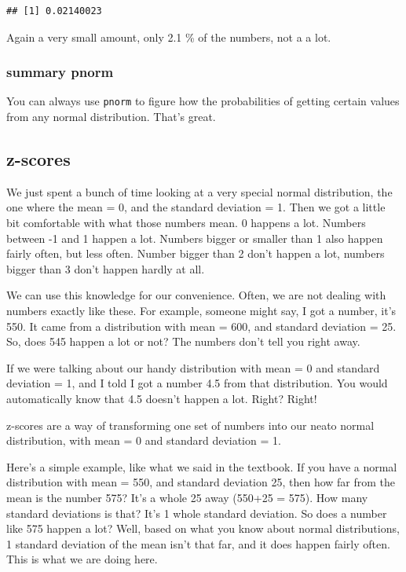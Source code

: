 \documentclass[]{book}
\theoremstyle{definition}
\theoremstyle{definition}
\theoremstyle{definition}
\theoremstyle{remark}
\begin{document}
\begin{verbatim}
## [1] 0.02140023
\end{verbatim}

Again a very small amount, only 2.1 \% of the numbers, not a a lot.

\subsubsection{summary pnorm}\label{summary-pnorm}

You can always use \texttt{pnorm} to figure how the probabilities of
getting certain values from any normal distribution. That's great.

\subsection{z-scores}\label{z-scores}

We just spent a bunch of time looking at a very special normal
distribution, the one where the mean = 0, and the standard deviation =
1. Then we got a little bit comfortable with what those numbers mean. 0
happens a lot. Numbers between -1 and 1 happen a lot. Numbers bigger or
smaller than 1 also happen fairly often, but less often. Number bigger
than 2 don't happen a lot, numbers bigger than 3 don't happen hardly at
all.

We can use this knowledge for our convenience. Often, we are not dealing
with numbers exactly like these. For example, someone might say, I got a
number, it's 550. It came from a distribution with mean = 600, and
standard deviation = 25. So, does 545 happen a lot or not? The numbers
don't tell you right away.

If we were talking about our handy distribution with mean = 0 and
standard deviation = 1, and I told I got a number 4.5 from that
distribution. You would automatically know that 4.5 doesn't happen a
lot. Right? Right!

z-scores are a way of transforming one set of numbers into our neato
normal distribution, with mean = 0 and standard deviation = 1.

Here's a simple example, like what we said in the textbook. If you have
a normal distribution with mean = 550, and standard deviation 25, then
how far from the mean is the number 575? It's a whole 25 away (550+25 =
575). How many standard deviations is that? It's 1 whole standard
deviation. So does a number like 575 happen a lot? Well, based on what
you know about normal distributions, 1 standard deviation of the mean
isn't that far, and it does happen fairly often. This is what we are
doing here.
\end{document}

